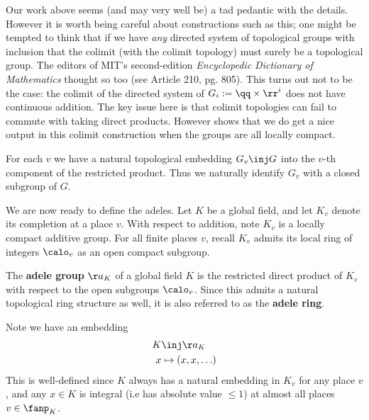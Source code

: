 \documentclass[11pt, x11names, openany]{book}
\begin{document}
\begin{warning}
    Our work above seems (and may very well be) a tad pedantic with the details. However it is worth being careful about constructions such as this; one might be tempted to think that if we have \textit{any} directed system of topological groups with inclusion that the colimit (with the colimit topology) must surely be a topological group. The editors of MIT's second-edition \textit{Encyclopedic Dictionary of Mathematics} thought so too (see Article 210, pg. 805). This turns out not to be the case: the colimit of the directed system of $G_i := \qq \times \rr^i$ does not have continuous addition. The key issue here is that colimit topologies can fail to commute with taking direct products. However \cite{Shimomura-topgrp-colimit} shows that we do get a nice output in this colimit construction when the groups are all locally compact.
\end{warning}



\begin{observation}
    For each $v$ we have a natural topological embedding $G_v \inj G$ into the $v$-th component of the restricted product. Thus we naturally identify $G_v$ with a closed subgroup of $G$.
\end{observation}


We are now ready to define the adeles. Let $K$ be a global field, and let $K_v$ denote its completion at a place $v$. With respect to addition, note $K_v$ is a locally compact additive group. For all finite places $v$, recall $K_v$ admits its local ring of integers $\calo_v$ as an open compact subgroup.

\begin{defn}
    The \textbf{adele group} $\aa_K$ of a global field $K$ is the restricted direct product of $K_v$ with respect to the open subgroups $\calo_v$. Since this admits a natural topological ring structure as well, it is also referred to as the \textbf{adele ring}.
\end{defn}

Note we have an embedding
\begin{equation*}
\begin{split}
    K & \inj \aa_K\\
    x &\mapsto (x, x, \ldots)
\end{split}
\end{equation*}
This is well-defined since $K$ always has a natural embedding in $K_v$ for any place $v$, and any $x \in K$ is integral (i.e has absolute value $\leq 1$) at almost all places $v \in \fanp_K$.
\end{document}

